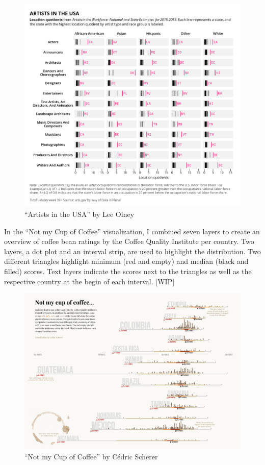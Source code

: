 \documentclass[
]{krantz}
\begin{document}
\begin{figure}
\centering
\includegraphics{./img/artists-tt202239-lee-olney.png}
\caption{\label{fig:02imgVizArtistsUSA}``Artists in the USA'' by Lee Olney}
\end{figure}

In the ``Not my Cup of Coffee'' visualization, I combined seven layers to create an overview of coffee bean ratings by the Coffee Quality Institute per country. Two layers, a dot plot and an interval strip, are used to highlight the distribution. Two different triangles highlight minimum (red and empty) and median (black and filled) scores. Text layers indicate the scores next to the triangles as well as the respective country at the begin of each interval. {[}WIP{]}

\begin{figure}
\centering
\includegraphics{./img/coffee-ratings.png}
\caption{\label{fig:02imgVizCoffeeRatings}``Not my Cup of Coffee'' by Cédric Scherer}
\end{figure}
\end{document}
